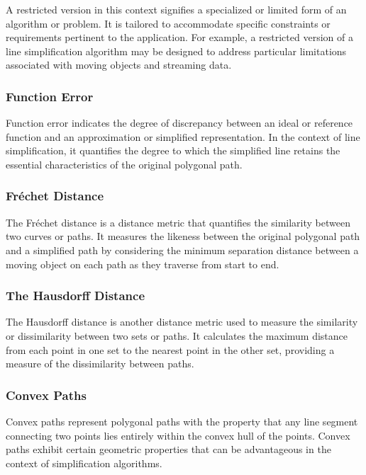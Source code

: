 \documentclass[twoside,12pt, a4paper]{report}
\begin{document}
A restricted version in this context signifies a specialized or limited form of an algorithm or problem. It is tailored to accommodate specific constraints or requirements pertinent to the application. For example, a restricted version of a line simplification algorithm may be designed to address particular limitations associated with moving objects and streaming data.



\subsubsection{Function Error} 

Function error indicates the degree of discrepancy between an ideal or reference function and an approximation or simplified representation. In the context of line simplification, it quantifies the degree to which the simplified line retains the essential characteristics of the original polygonal path.

\subsubsection{Fréchet Distance} 

The Fréchet distance is a distance metric that quantifies the similarity between two curves or paths. It measures the likeness between the original polygonal path and a simplified path by considering the minimum separation distance between a moving object on each path as they traverse from start to end.


\subsubsection{The Hausdorff Distance} 

The Hausdorff distance is another distance metric used to measure the similarity or dissimilarity between two sets or paths. It calculates the maximum distance from each point in one set to the nearest point in the other set, providing a measure of the dissimilarity between paths.


\subsubsection{Convex Paths} 

Convex paths represent polygonal paths with the property that any line segment connecting two points lies entirely within the convex hull of the points. Convex paths exhibit certain geometric properties that can be advantageous in the context of simplification algorithms.
\end{document}
